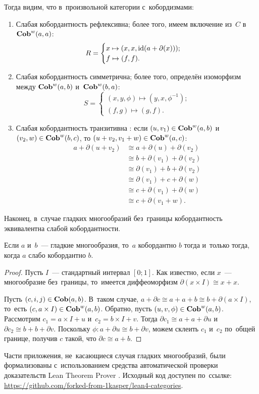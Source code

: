 \documentclass[a4paper,oneside]{article}
\begin{document}
Тогда видим, что в~произвольной категории с~кобордизмами:
\begin{enumerate}
  \item Слабая кобордантность рефлексивна; более того, имеем включение из~$C$ в~$\mathbf{Cob}^w(a, a)$:
  \[
    R = \begin{cases}
      x \mapsto (x, x, \mathrm{id}(a + \partial(x))); \\
      f \mapsto (f, f).
    \end{cases}
  \]
  \item Слабая кобордантность симметрична; более того, определён изоморфизм между $\mathbf{Cob}^w(a, b)$ и~$\mathbf{Cob}^w(b, a)$:
  \[
    S = \begin{cases}
      (x, y, \phi) \mapsto (y, x, \phi^{-1}); \\
      (f, g) \mapsto (g, f).
    \end{cases}
  \]
  \item Слабая кобордантность транзитивна \cite{Weston}: если $(u,\allowbreak v_1) \in \mathbf{Cob}^w(a,\allowbreak b)$ и~$(v_2,\allowbreak w) \in \mathbf{Cob}^w(b,\allowbreak c)$,
  то $(u + v_2, v_1 + w) \in \mathbf{Cob}^w(a, c)$:
  \[
  \begin{aligned}
    a + \partial(u + v_2) & \cong a + \partial(u) + \partial(v_2) \\
                          & \cong b + \partial(v_1) + \partial(v_2) \\
                          & \cong \partial(v_1) + b + \partial(v_2) \\
                          & \cong \partial(v_1) + c + \partial(w) \\
                          & \cong c + \partial(v_1) + \partial(w) \\
                          & \cong c + \partial(v_1 + w).
  \end{aligned}
  \]
\end{enumerate}

Наконец, в~случае гладких многообразий без~границы кобордантность эквивалентна слабой кобордантности.

\begin{statement*}
  Если $a$ и~$b$~— гладкие многообразия, то~$a$ кобордантно $b$ тогда и~только тогда,
  когда $a$ слабо кобордантно $b$.
\end{statement*}

\begin{proof}
  Пусть $I$~— стандартный интервал $[0; 1]$.
  Как известно, если $x$~— многообразие без~границы,
  то~имеется диффеоморфизм $\partial(x \times I) \cong x + x$.

  Пусть $(c, i, j) \in \mathbf{Cob}(a, b)$. В~таком случае, $a + \partial c \cong a + a + b \cong b + \partial(a \times I)$,
  то~есть $(c, a \times I) \in \mathbf{Cob}^w(a, b)$.
  Обратно, пусть $(u, v, \phi) \in \mathbf{Cob}^w(a, b)$. Рассмотрим $c_1 = a \times I + u$ и~$c_2 = b \times I + v$.
  Тогда $\partial c_1 \cong a + a + \partial u $ и~$\partial c_2 \cong b + b + \partial v$.
  Поскольку $\phi : a + \partial u \cong b + \partial v$, можем склеить $c_1$ и~$c_2$ по~общей
  границе, получив $c$ такой, что $\partial c \cong a + b$.
\end{proof}

Части приложения, не~касающиеся случая гладких многообразий, были формализованы с~использованием
средства автоматической проверки доказательств Lean Theorem Prover \cite{Lean}. Исходный код доступен по~ссылке:
\url{https://github.com/forked-from-1kasper/lean4-categories}.

\pagebreak
\end{document}
